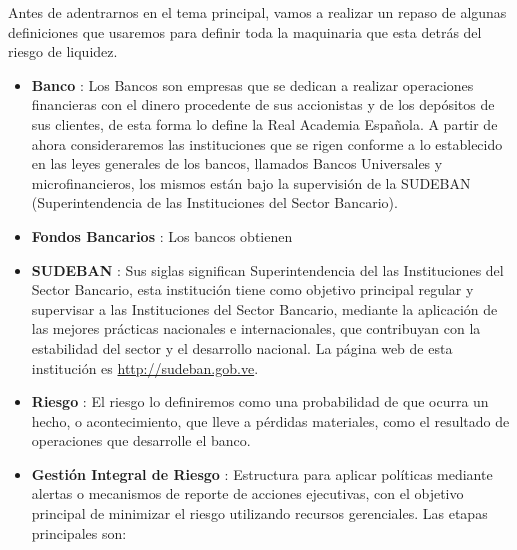\documentclass[]{article}
\begin{document}
Antes de adentrarnos en el tema principal, vamos a realizar un repaso de
algunas definiciones que usaremos para definir toda la maquinaria que
esta detrás del riesgo de liquidez.

\begin{itemize}
\item
  \textbf{Banco} : Los Bancos son empresas que se dedican a realizar
  operaciones financieras con el dinero procedente de sus accionistas y
  de los depósitos de sus clientes, de esta forma lo define la Real
  Academia Española. A partir de ahora consideraremos las instituciones
  que se rigen conforme a lo establecido en las leyes generales de los
  bancos, llamados Bancos Universales y microfinancieros, los mismos
  están bajo la supervisión de la SUDEBAN (Superintendencia de las
  Instituciones del Sector Bancario).
\item
  \textbf{Fondos Bancarios} : Los bancos obtienen
\item
  \textbf{SUDEBAN} : Sus siglas significan Superintendencia del las
  Instituciones del Sector Bancario, esta institución tiene como
  objetivo principal regular y supervisar a las Instituciones del Sector
  Bancario, mediante la aplicación de las mejores prácticas nacionales e
  internacionales, que contribuyan con la estabilidad del sector y el
  desarrollo nacional. La página web de esta institución es
  \url{http://sudeban.gob.ve}.
\item
  \textbf{Riesgo} : El riesgo lo definiremos como una probabilidad de
  que ocurra un hecho, o acontecimiento, que lleve a pérdidas
  materiales, como el resultado de operaciones que desarrolle el banco.
\item
  \textbf{Gestión Integral de Riesgo} : Estructura para aplicar
  políticas mediante alertas o mecanismos de reporte de acciones
  ejecutivas, con el objetivo principal de minimizar el riesgo
  utilizando recursos gerenciales. Las etapas principales son:


\end{itemize}
\end{document}
